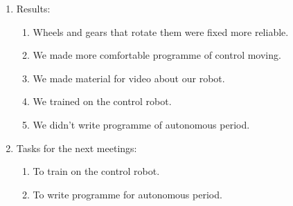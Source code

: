 \begin{enumerate}
	\item Results:
	\begin{enumerate}
		
		\item Wheels and gears that rotate them were fixed more reliable.
		
		\item We made more comfortable programme of control moving.
		
        \item We made material for video about our robot.
        
        \item We trained on the control robot.
        
        \item We didn't write programme of autonomous period. 
		
	\end{enumerate}
	
	\item Tasks for the next meetings:
	\begin{enumerate}
		
		\item To train on the control robot.
		
		\item To write programme for autonomous period.
			
	\end{enumerate}
\end{enumerate}
\fillpage
